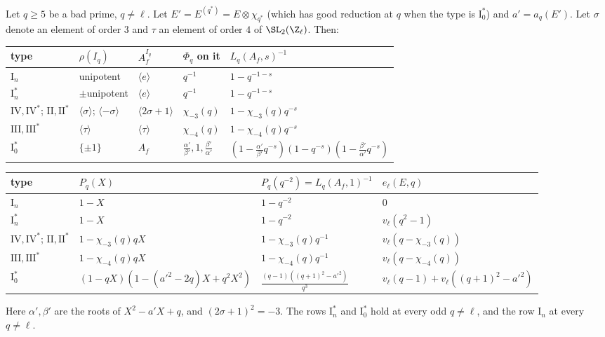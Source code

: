 \begin{lemma}\label{lem:lfunctions:euler}
Let $q\ge5$ be a bad prime, $q\ne\ell$. Let $E'=E^{(q^*)}=E\otimes\chi_{q^*}$ (which has good reduction at $q$ when the type is $\mathrm I_0^*$) and $a'=a_q(E')$. Let $\sigma$ denote an element
of order $3$ and $\tau$ an element of order $4$ of $\SL_2(\Z_\ell)$. Then:
\begin{center}\footnotesize\setlength{\tabcolsep}{4pt}
\begin{tabular}{lllll}
\toprule
type & $\rho(I_q)$ & $A_f^{I_q}$ & $\Phi_q$ on it & $L_q(A_f,s)^{-1}$\\
\midrule
$\mathrm I_n$ & unipotent & $\langle e\rangle$ & $q^{-1}$ & $1-q^{-1-s}$\\
$\mathrm I_n^*$ & $\pm$unipotent & $\langle e\rangle$ & $q^{-1}$ & $1-q^{-1-s}$\\
$\mathrm{IV},\mathrm{IV}^*$; $\mathrm{II},\mathrm{II}^*$ & $\langle\sigma\rangle$; $\langle-\sigma\rangle$ & $\langle2\sigma+1\rangle$ & $\chi_{-3}(q)$ & $1-\chi_{-3}(q)q^{-s}$\\
$\mathrm{III},\mathrm{III}^*$ & $\langle\tau\rangle$ & $\langle\tau\rangle$ & $\chi_{-4}(q)$ & $1-\chi_{-4}(q)q^{-s}$\\
$\mathrm I_0^*$ & $\{\pm1\}$ & $A_f$ & $\frac{\alpha'}{\beta'},1,\frac{\beta'}{\alpha'}$ & $(1-\frac{\alpha'}{\beta'}q^{-s})(1-q^{-s})(1-\frac{\beta'}{\alpha'}q^{-s})$\\
\bottomrule
\end{tabular}

\medskip
\begin{tabular}{llll}
\toprule
type & $P_q(X)$ & $P_q(q^{-2})=L_q(A_f,1)^{-1}$ & $e_\ell(E,q)$\\
\midrule
$\mathrm I_n$ & $1-X$ & $1-q^{-2}$ & $0$\\
$\mathrm I_n^*$ & $1-X$ & $1-q^{-2}$ & $v_\ell(q^2-1)$\\
$\mathrm{IV},\mathrm{IV}^*$; $\mathrm{II},\mathrm{II}^*$ & $1-\chi_{-3}(q)qX$ & $1-\chi_{-3}(q)q^{-1}$ & $v_\ell(q-\chi_{-3}(q))$\\
$\mathrm{III},\mathrm{III}^*$ & $1-\chi_{-4}(q)qX$ & $1-\chi_{-4}(q)q^{-1}$ & $v_\ell(q-\chi_{-4}(q))$\\
$\mathrm I_0^*$ & $(1-qX)(1-(a'^2-2q)X+q^2X^2)$ & $\frac{(q-1)((q+1)^2-a'^2)}{q^3}$ & $v_\ell(q-1)+v_\ell((q+1)^2-a'^2)$\\
\bottomrule
\end{tabular}
\end{center}
Here $\alpha',\beta'$ are the roots of $X^2-a'X+q$, and $(2\sigma+1)^2=-3$. The rows $\mathrm I_n^*$ and $\mathrm I_0^*$ hold at every odd $q\ne\ell$, and the row $\mathrm I_n$ at every $q\ne\ell$.
\end{lemma}

